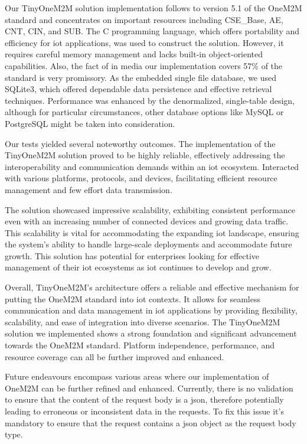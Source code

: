 \documentclass[a4paper,fleqn]{cas-dc}
\begin{document}
Our TinyOneM2M solution implementation follows to version 5.1 of the OneM2M standard and concentrates on important resources including CSE\_Base, AE, CNT, CIN, and SUB. The C programming language, which offers portability and efficiency for  \gls{iot} applications, was used to construct the solution. However, it requires careful memory management and lacks built-in object-oriented capabilities. Also, the fact of in media our implementation covers 57\% of the standard is very promissory. As the embedded single file database, we used SQLite3, which offered dependable data persistence and effective retrieval techniques. Performance was enhanced by the denormalized, single-table design, although for particular circumstances, other database options like MySQL or PostgreSQL might be taken into consideration.

Our tests yielded several noteworthy outcomes. The implementation of the TinyOneM2M solution proved to be highly reliable, effectively addressing the interoperability and communication demands within an  \gls{iot} ecosystem. Interacted with various platforms, protocols, and devices, facilitating efficient resource management and few effort data transmission. 

The solution showcased impressive scalability, exhibiting consistent performance even with an increasing number of connected devices and growing data traffic. This scalability is vital for accommodating the expanding  \gls{iot} landscape, ensuring the system's ability to handle large-scale deployments and accommodate future growth.  This solution has potential for enterprises looking for effective management of their \gls{iot} ecosystems as \gls{iot} continues to develop and grow.

Overall, TinyOneM2M's architecture offers a reliable and effective mechanism for putting the OneM2M standard into  \gls{iot} contexts. It allows for seamless communication and data management in  \gls{iot} applications by providing flexibility, scalability, and ease of integration into diverse scenarios. The TinyOneM2M solution we implemented shows a strong foundation and significant advancement towards the OneM2M standard. Platform independence, performance, and resource coverage can all be further improved and enhanced.

Future endeavours encompass various areas where our implementation of OneM2M can be further refined and enhanced. Currently, there is no validation to ensure that the content of the request body is a \gls{json}, therefore potentially leading to erroneous or inconsistent data in the requests. To fix this issue it's mandatory to ensure that the request contains a \gls{json} object as the request body type. 
\end{document}
